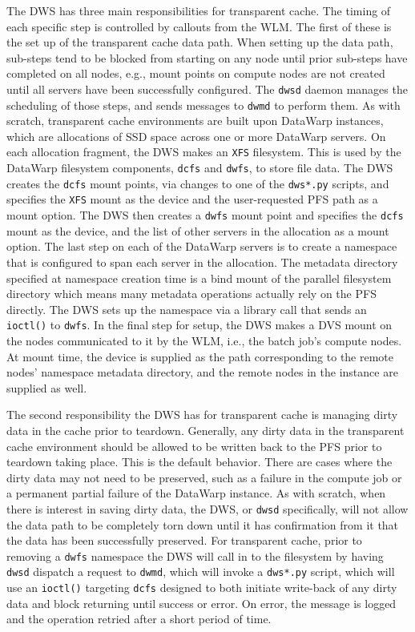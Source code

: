 \documentclass[10pt, conference, compsocconf]{IEEEtran}
\begin{document}
The DWS has three main responsibilities for transparent cache.  The timing of each specific step is controlled by callouts from the WLM.  The first of these is the set up of the transparent cache data path.  When setting up the data path, sub-steps tend to be blocked from starting on any node until prior sub-steps have completed on all nodes, e.g., mount points on compute nodes are not created until all servers have been successfully configured.  The \texttt{dwsd} daemon manages the scheduling of those steps, and sends messages to \texttt{dwmd} to perform them.  As with scratch, transparent cache environments are built upon DataWarp instances, which are allocations of SSD space across one or more DataWarp servers.  On each allocation fragment, the DWS makes an \texttt{XFS} filesystem.  This is used by the DataWarp filesystem components, \texttt{dcfs} and \texttt{dwfs}, to store file data.  The DWS creates the \texttt{dcfs} mount points, via changes to one of the \texttt{dws*.py} scripts, and specifies the \texttt{XFS} mount as the device and the user-requested PFS path as a mount option.  The DWS then creates a \texttt{dwfs} mount point and specifies the \texttt{dcfs} mount as the device, and the list of other servers in the allocation as a mount option.  The last step on each of the DataWarp servers is to create a namespace that is configured to span each server in the allocation.  The metadata directory specified at namespace creation time is a bind mount of the parallel filesystem directory which means many metadata operations actually rely on the PFS directly.  The DWS sets up the namespace via a library call that sends an \texttt{ioctl()} to \texttt{dwfs}.  In the final step for setup, the DWS makes a DVS mount on the nodes communicated to it by the WLM, i.e., the batch job's compute nodes.  At mount time, the device is supplied as the path corresponding to the remote nodes' namespace metadata directory, and the remote nodes in the instance are supplied as well.

The second responsibility the DWS has for transparent cache is managing dirty data in the cache prior to teardown.  Generally, any dirty data in the transparent cache environment should be allowed to be written back to the PFS prior to teardown taking place.  This is the default behavior.  There are cases where the dirty data may not need to be preserved, such as a failure in the compute job or a permanent partial failure of the DataWarp instance.  As with scratch, when there is interest in saving dirty data, the DWS, or \texttt{dwsd} specifically, will not allow the data path to be completely torn down until it has confirmation from it that the data has been successfully preserved.  For transparent cache, prior to removing a \texttt{dwfs} namespace the DWS will call in to the filesystem by having \texttt{dwsd} dispatch a request to \texttt{dwmd}, which will invoke a \texttt{dws*.py} script, which will use an \texttt{ioctl()} targeting \texttt{dcfs} designed to both initiate write-back of any dirty data and block returning until success or error.  On error, the message is logged and the operation retried after a short period of time.
\end{document}

